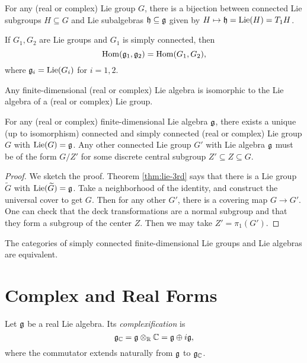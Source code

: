 \begin{theorem}
  For any (real or complex) Lie group
  $G$, there is a bijection between
  connected Lie subgroups $H \subseteq G$
  and Lie subalgebras
  $\mathfrak{h} \subseteq \mathfrak{g}$ given by
  $H \mapsto \mathfrak{h} = \operatorname{Lie}(H) = T_1 H$.
\end{theorem}

\begin{theorem}
  If $G_1, G_2$ are Lie groups and
  $G_1$ is simply connected, then
  \[
    \operatorname{Hom}(\mathfrak{g}_1, \mathfrak{g}_2) = \operatorname{Hom}(G_1, G_2),
  \]
  where $\mathfrak{g}_i = \operatorname{Lie}(G_i)$ for $i = 1, 2$.
\end{theorem}

\begin{theorem}\label{thm:lie-3rd}
  Any finite-dimensional (real or complex)
  Lie algebra is isomorphic to the
  Lie algebra of a (real or complex)
  Lie group.
\end{theorem}

\begin{corollary}
  For any (real or complex)
  finite-dimensional Lie algebra
  $\mathfrak{g}$, there exists a unique (up to
  isomorphism) connected and simply
  connected (real or complex) Lie group $G$
  with $\operatorname{Lie}(G) = \mathfrak{g}$. Any other connected
  Lie group $G'$ with Lie algebra
  $\mathfrak{g}$ must be of the form
  $G / Z'$ for some discrete central
  subgroup $Z' \subseteq Z \subseteq G$.
\end{corollary}

\begin{proof}
  We sketch the proof. Theorem
  \ref{thm:lie-3rd} says that there is a
  Lie group $\widetilde{G}$ with $\operatorname{Lie}(\widetilde{G}) = \mathfrak{g}$.
  Take a neighborhood of the identity, and
  construct the universal cover to get
  $G$. Then for any other
  $G'$, there is a covering map
  $G \to G'$. One can check that
  the deck transformations
  are a normal subgroup and
  that they form a
  subgroup of the center $Z$.
  Then we may take $Z' = \pi_1(G')$.
\end{proof}

\begin{corollary}
  The categories of simply connected
  finite-dimensional Lie groups and
  Lie algebras are equivalent.
\end{corollary}

\section{Complex and Real Forms}

\begin{definition}
  Let $\mathfrak{g}$ be a real Lie algebra.
  Its \emph{complexification} is
  \[
    \mathfrak{g}_{\mathbb{C}} = \mathfrak{g} \otimes_{\mathbb{R}} \mathbb{C}
    = \mathfrak{g} \oplus i \mathfrak{g},
  \]
  where the commutator extends naturally
  from $\mathfrak{g}$ to $\mathfrak{g}_{\mathbb{C}}$.
\end{definition}

